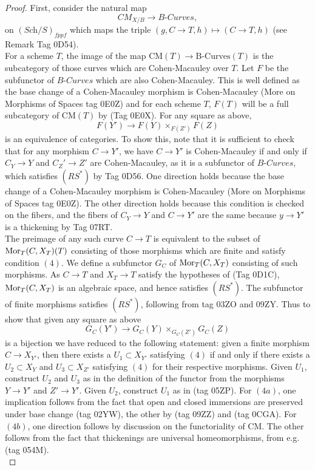 \documentclass{stacks-project}
\theoremstyle{plain}
\theoremstyle{definition}
\theoremstyle{remark}
\numberwithin{equation}{subsection}
\def\Sch{\textit{Sch}}
\def\Mor{\mathop{\rm Mor}\nolimits}
\def\CMfunctor{\mathcal{C}\!{\it oh}}
\def\CMfunctor{\text{CM}}
\begin{document}
\begin{proof}

First, consider the natural map 
$$
\textit{CM}_{X/B} \longrightarrow \textit{B-Curves},
$$ on $(\Sch/S)_{fppf}$ which maps the triple $(g, C \to T, h) \mapsto (C \to T, h)$ (see Remark Tag 0D54). \\

For a scheme $T$, the image of the map $\CMfunctor(T) \to \text{B-Curves}(T)$ is the subcategory of those curves which are Cohen-Macauley over $T$. Let $F$ be the subfunctor of $\textit{B-Curves}$ which are also Cohen-Macauley. This is well defined as the base change of a Cohen-Macauley morphism is Cohen-Macauley (More on Morphisms of Spaces tag 0E0Z) and for each scheme $T$, $F(T)$ will be a full subcategory of $\CMfunctor(T)$ by (Tag 0E0X). For any square as above, $$
F(Y') \longrightarrow F(Y) \times_{F(Z')} F(Z)
$$
is an equivalence of categories. To show this, note that it is sufficient to check that for any morphism $C \to Y'$, we have $C \to Y'$ is Cohen-Macauley if and only if $C_Y \to Y$ and $C_Z' \to Z'$ are Cohen-Macauley, as it is a subfunctor of $\textit{B-Curves}$, which satisfies $(RS^*)$ by Tag 0D56. One direction holds because the base change of a Cohen-Macauley morphism is Cohen-Macauley (More on Morphisms of Spaces tag 0E0Z). The other direction holds because this condition is checked on the fibers, and the fibers of $C_Y \to Y$ and $C \to Y'$ are the same because $y \to Y'$ is a thickening by Tag 07RT.\\

The preimage of any such curve $C\to T$ is equivalent to the subset of $\Mor_T(C,X_T)(T)$ consisting of those morphisms which are finite and satisfy condition $(4)$. We define a subfunctor $G_C$ of $\Mor_T(C,X_T)$ consisting of such morphisms. As $C \to T$ and $X_T \to T$ satisfy the hypotheses of (Tag 0D1C), $\Mor_T(C,X_T)$ is an algebraic space, and hence satisfies $(RS^*)$. The subfunctor of finite morphisms satisfies $(RS^*)$, following from tag 03ZO and 09ZY. Thus to show that given any square as above $$
G_C(Y') \longrightarrow G_C(Y) \times_{G_C(Z')} G_C(Z)
$$
is a bijection we have reduced to the following statement: given a finite morphism $C \to X_{Y'}$, then there exists a $U_1\subset X_{Y'}$ satisfying $(4)$ if and only if there exists a $U_2 \subset X_Y$ and $U_3 \subset X_{Z'}$ satisfying $(4)$ for their respective morphisms. Given $U_1$, construct $U_2$ and $U_3$ as in the definition of the functor from the morphisms $Y \to Y'$ and $Z' \to Y'$. Given $U_2$, construct $U_1$ as in (tag 05ZP). For $(4a)$, one implication follows from the fact that open and closed immersions are preserved under base change (tag 02YW), the other by (tag 09ZZ) and (tag 0CGA). For $(4b)$, one direction follows by discussion on the functoriality of $\CMfunctor$. The other follows from the fact that thickenings are universal homeomorphisms, from e.g. (tag 054M).\\


\end{proof}
\end{document}
